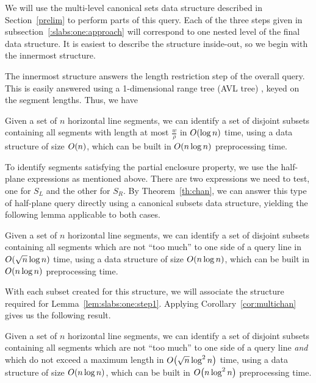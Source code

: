 We will use the multi-level canonical sets data structure described in 
Section~\ref{prelim} to perform parts of this query.
Each of the three steps given in subsection~\ref{:slabs:one:approach} will 
correspond to one nested level of the final data structure.
It is easiest to describe the structure inside-out, so we begin with the 
innermost structure.



The innermost structure answers the length restriction step of the overall 
query. 
This is easily answered using a 1-dimensional range tree (AVL tree) 
\cite{Deberg}, 
keyed on the segment lengths. Thus, we have

\begin{lemma}
\label{lem:slabs:one:step1}
Given a set of $n$ horizontal line segments, we can identify a set of disjoint 
subsets containing all segments with length at most $\frac{w}{\rho}$ in 
$O\!\left(\log{n}\right)$ time, using a data structure of size $O\!\left(n\right)$, which can be 
built in $O\!\left(n \log{n}\right)$ preprocessing time.
\end{lemma}



To identify segments satisfying the partial enclosure property, we use the 
half-plane expressions as mentioned above. 
There are two expressions we need to test, one for $S_L$ and the other for $S_R$. 
By Theorem~\ref{th:chan}, we can answer this type of half-plane query directly 
using a canonical subsets data structure, yielding the following lemma 
applicable to both cases.

\begin{lemma}
\label{lem:slabs:one:step2a}
Given a set of $n$ horizontal line segments, we can identify a set of disjoint 
subsets containing all segments which are not ``too much'' to one side of a 
query line in $O\!\left(\sqrt{n}\log{n}\right)$ time, using a data structure of size 
$O\!\left(n\log{n}\right)$, which can be built in $O\!\left(n\log{n}\right)$ preprocessing time.
\end{lemma}

With each subset created for this structure, we will associate the structure 
required for Lemma~\ref{lem:slabs:one:step1}.
Applying Corollary~\ref{cor:multichan} gives us the following result.

\begin{lemma}
\label{lem:slabs:one:step2b}
Given a set of $n$ horizontal line segments, we can identify a set of disjoint 
subsets containing all segments which are not ``too much'' to one side of a 
query line \emph{and} which do not exceed a maximum length in 
$O\!\left(\sqrt{n}\log^2{n}\right)$ time, using a data structure of size 
$O\!\left(n\log{n}\right)$, which can be built in $O\!\left(n\log^2{n}\right)$ preprocessing 
time.
\end{lemma}


